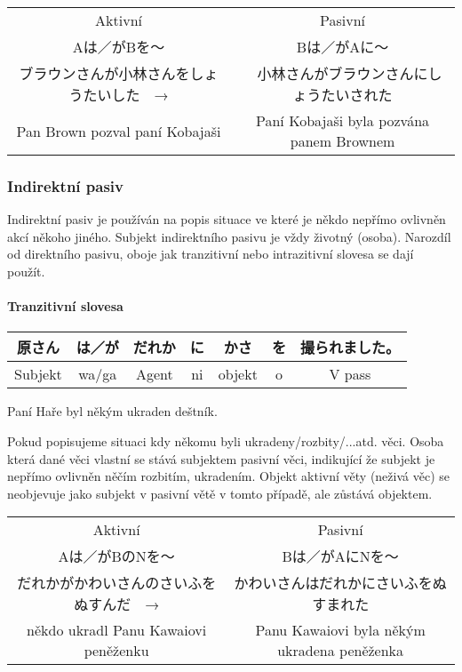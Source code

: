\begin{center}
\begin{tabular}{cc}
Aktivní&Pasivní\\
Aは／がBを〜&Bは／がAに〜\\
ブラウンさんが小林さんをしょうたいした　→&　小林さんがブラウンさんにしょうたいされた\\
Pan Brown pozval paní Kobajaši&Paní Kobajaši byla pozvána panem Brownem\\
\end{tabular}
\end{center}




\subsubsection{Indirektní pasiv}
Indirektní pasiv je používán na popis situace ve které je někdo nepřímo ovlivněn akcí někoho jiného. Subjekt indirektního pasivu je vždy životný (osoba). Narozdíl od direktního pasivu, oboje jak tranzitivní nebo intrazitivní slovesa se dají použít.

\paragraph{Tranzitivní slovesa}
\begin{center}
\begin{tabular}{||c|c||c|c||c||c||c||}
\hline
原さん&は／が&だれか&に&かさ&を&撮られました。\\
\hline
Subjekt&wa/ga&Agent&ni&objekt&o&V pass\\
\hline
\end{tabular}
\end{center}
Paní Haře byl někým ukraden deštník.

Pokud popisujeme situaci kdy někomu byli ukradeny/rozbity/...atd. věci. Osoba která dané věci vlastní se stává subjektem pasivní věci, indikující že subjekt je nepřímo ovlivněn něčím rozbitím, ukradením. Objekt aktivní věty (neživá věc) se neobjevuje jako subjekt v pasivní větě v tomto případě, ale zůstává objektem.

\begin{center}
\begin{tabular}{cc}
Aktivní&Pasivní\\
Aは／がBのNを〜&Bは／がAにNを〜\\
だれかがかわいさんのさいふをぬすんだ　→&かわいさんはだれかにさいふをぬすまれた\\
někdo ukradl Panu Kawaiovi peněženku&Panu Kawaiovi byla někým ukradena peněženka\\
\end{tabular}
\end{center}

